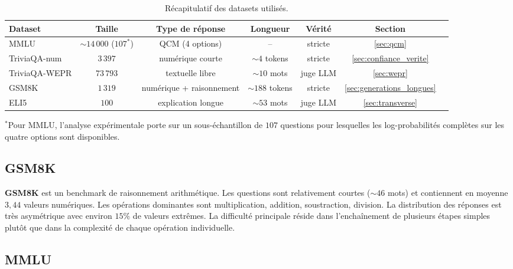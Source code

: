 \documentclass[12pt,a4paper]{article}
\begin{document}
\begin{table}[H]
\centering
\caption{Récapitulatif des datasets utilisés.}
\label{tab:datasets_synth}
\footnotesize
\setlength{\tabcolsep}{4pt}
\begin{tabular}{lcccccc}
\toprule
Dataset & Taille & Type de réponse & Longueur & Vérité & Section \\
\midrule
MMLU         & $\sim 14\,000$ ($107^*$) & QCM (4 options)          & --                & stricte   & \ref{sec:qcm} \\
TriviaQA-num & $3\,397$                 & numérique courte         & $\sim 4$ tokens   & stricte   & \ref{sec:confiance_verite} \\
TriviaQA-WEPR& $73\,793$                & textuelle libre          & $\sim 10$ mots    & juge LLM  & \ref{sec:wepr} \\
GSM8K        & $1\,319$                 & numérique + raisonnement & $\sim 188$ tokens & stricte   & \ref{sec:generations_longues} \\
ELI5         & $100$                    & explication longue       & $\sim 53$ mots    & juge LLM  & \ref{sec:transverse} \\
\bottomrule
\end{tabular}

\vspace{0.3em}
{\footnotesize $^*$Pour MMLU, l'analyse expérimentale porte sur un sous-échantillon de $107$ questions pour lesquelles les log-probabilités complètes sur les quatre options sont disponibles.}
\end{table}

\subsection{GSM8K}

\textbf{GSM8K} est un benchmark de raisonnement arithmétique. Les questions sont relativement courtes ($\sim 46$ mots) et contiennent en moyenne $3{,}44$ valeurs numériques. Les opérations dominantes sont multiplication, addition, soustraction, division. La distribution des réponses est très asymétrique avec environ $15\%$ de valeurs extrêmes. La difficulté principale réside dans l'enchaînement de plusieurs étapes simples plutôt que dans la complexité de chaque opération individuelle.

\subsection{MMLU}
\end{document}
